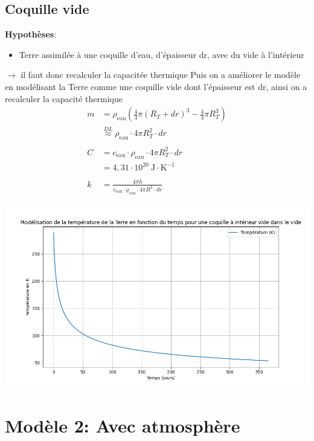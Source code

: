 \documentclass[a4paper,12pt]{article}
\begin{document}
\subsection{Coquille vide }
\textbf{Hypothèses}:
\begin{itemize}
    \item Terre assimilée à une coquille d'eau, d'épaisseur dr, avec du vide à l'intérieur
    
\end{itemize}
$\rightarrow$ il faut donc recalculer la capacitée thermique 
Puis on a améliorer le modèle en modélisant la Terre comme une coquille vide dont l'épaisseur est dr, ainsi on a recalculer la capacité thermique  \\

\begin{align*}
m &= \rho_{\text{eau}} \left( \frac{4}{3} \pi (R_T + dr)^3 - \frac{4}{3} \pi R_T^3 \right) \\
&\overset{DL}{\approx} \rho_{\text{eau}} \cdot 4\pi R_T^2 \cdot dr \\
\\
C &= c_{\text{eau}} \cdot \rho_{\text{eau}} \cdot 4\pi R_T^2 \cdot dr \\
&= 4{,}31 \cdot 10^{20} \ \text{J} \cdot \text{K}^{-1} \\
\\
k &= \frac{4\pi h }{c_{\text{eau}} \cdot \rho_{\text{eau}} \cdot 4\pi R^2 \cdot dr}
\end{align*}

    \includegraphics[width=0.8\linewidth]{../modele1/figures/modele1_coquille.png} 


\section{Modèle 2: Avec atmosphère}
\end{document}
